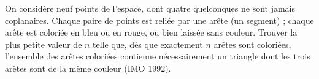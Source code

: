 On considère neuf points de l'espace, dont quatre quelconques ne sont jamais coplanaires. Chaque paire de points est reliée par une arête (un segment) ; chaque arête est coloriée en bleu ou en rouge, ou bien laissée sans couleur. Trouver la plus petite valeur de $n$ telle que, dès que exactement $n$ arêtes sont coloriées, l'ensemble des arêtes coloriées contienne nécessairement un triangle dont les trois arêtes sont de la même couleur (IMO 1992).
